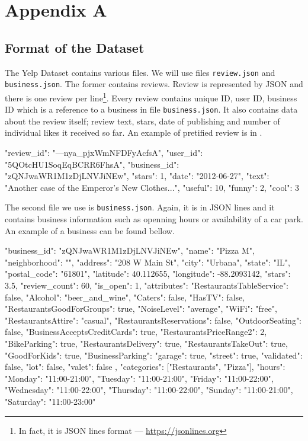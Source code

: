\chapter*{Appendix A}
\label{app:a}


\section{Format of the Dataset}
\label{sec:format}

The Yelp Dataset contains various files.
We will use files \texttt{review.json} and \texttt{business.json}.
The former contains reviews.
Review is represented by JSON and there is one review per line\footnote{In fact, it is JSON lines format --- \url{https://jsonlines.org}}.
Every review contains unique ID, user ID, business ID which is a reference to a business in file \texttt{business.json}.
It also contains data about the review itself; review text, stars, date of publishing and number of individual likes it received so far.
An example of pretified review is in .

\begin{code}
{
	"review_id": "---nya_pjxWmNFDFyAcfsA",
	"user_id": "5QOtcHU1SoqEqBCRR6FhsA",
	"business_id": "zQNJwaWR1M1zDjLNVJiNEw",
	"stars": 1,
	"date": "2012-06-27",
	"text": "Another case of the Emperor's New Clothes...",
	"useful": 10,
	"funny": 2,
	"cool": 3
}
\end{code}

The second file we use is \texttt{business.json}.
Again, it is in JSON lines and it contains business information such as openning hours or availability of a car park.
An example of a business can be found bellow.

\begin{code}
{
	"business_id": "zQNJwaWR1M1zDjLNVJiNEw",
	"name": "Pizza M",
	"neighborhood": "",
	"address": "208 W Main St",
	"city": "Urbana",
	"state": "IL",
	"postal_code": "61801",
	"latitude": 40.112655,
	"longitude": -88.2093142,
	"stars": 3.5,
	"review_count": 60,
	"is_open": 1,
	"attributes": {
		"RestaurantsTableService": false,
		"Alcohol": "beer_and_wine",
		"Caters": false,
		"HasTV": false,
		"RestaurantsGoodForGroups": true,
		"NoiseLevel": "average",
		"WiFi": "free",
		"RestaurantsAttire": "casual",
		"RestaurantsReservations": false,
		"OutdoorSeating": false,
		"BusinessAcceptsCreditCards": true,
		"RestaurantsPriceRange2": 2,
		"BikeParking": true,
		"RestaurantsDelivery": true,
		"RestaurantsTakeOut": true,
		"GoodForKids": true,
		"BusinessParking": {
			"garage": true,
			"street": true,
			"validated": false,
			"lot": false,
			"valet": false
		}
	},
	"categories": ["Restaurants", "Pizza"],
	"hours": {
		"Monday": "11:00-21:00",
		"Tuesday": "11:00-21:00",
		"Friday": "11:00-22:00",
		"Wednesday": "11:00-22:00",
		"Thursday": "11:00-22:00",
		"Sunday": "11:00-21:00",
		"Saturday": "11:00-23:00"
	}
}
\end{code}

